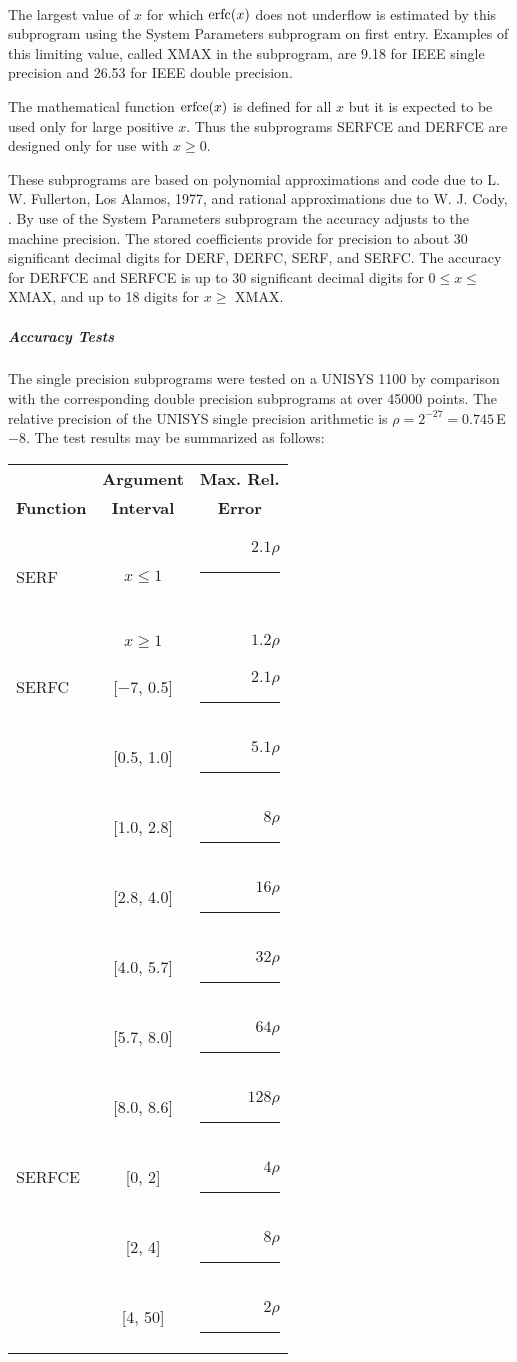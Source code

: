 \documentclass[twoside]{MATH77}
\begin{document}
\hspace{5pt}\mbox{ }

The largest value of $x$ for which $\erfc (x)$ does not underflow is estimated
by this subprogram using the System Parameters subprogram on first entry.
Examples of this limiting value, called XMAX in the subprogram, are 9.18 for
IEEE single precision and 26.53 for IEEE double precision.

The mathematical function $\erfce (x)$ is defined for all $x$ but it is
expected to be used only for large positive $x$. Thus the subprograms SERFCE
and DERFCE are designed only for use with $x \geq 0.$

These subprograms are based on polynomial approximations and code due to L.
W. Fullerton, Los Alamos, 1977, and rational approximations due to W. J.
Cody, \cite{Cody:1969:RCA}. By use of the System Parameters subprogram the
accuracy adjusts to the machine precision. The stored coefficients provide for
precision to about 30 significant decimal digits for DERF, DERFC, SERF, and
SERFC. The accuracy for DERFCE and SERFCE is up to 30 significant decimal
digits for $0 \leq x \leq $ XMAX, and up to 18 digits for $x \geq $ XMAX.

\subparagraph{Accuracy Tests}

The single precision subprograms were tested on a UNISYS 1100 by comparison
with the corresponding double precision subprograms at over 45000 points.
The relative precision of the UNISYS single precision arithmetic is $\rho =
2^{-27} = 0.745$\,E$-8$. The test results may be summarized as follows:

\begin{center}
\begin{tabular}{lcr}
 & {\bf Argument} & \multicolumn{1}{c}{\bf Max. Rel.}\\
\multicolumn{1}{c}{\bf Function} & {\bf Interval} &
\multicolumn{1}{c}{\bf Error}\\
SERF & \multicolumn{1}{c}{$x \leq 1$} & $2.1\rho $\rule{.25in}{0pt}~\\
 & $x \geq 1$ & $1.2\rho $\hspace{.25in}\rule[-7pt]{0pt}{8pt}\\
SERFC & [$-$7, 0.5] & $2.1\rho $\rule{.25in}{0pt}\\
 & [0.5, 1.0] & $5.1\rho $\rule{.25in}{0pt}\\
 & [1.0, 2.8] & $8\rho $\rule{.25in}{0pt}\\
 & [2.8, 4.0] & $16\rho $\rule{.25in}{0pt}\\
 & [4.0, 5.7] & $32\rho $\rule{.25in}{0pt}\\
 & [5.7, 8.0] & $64\rho $\rule{.25in}{0pt}\\
 & [8.0, 8.6] & $128\rho $\rule{.25in}{0pt}\rule[-7pt]{0pt}{8pt}\\
SERFCE & [0, 2] & $4\rho $\rule{.25in}{0pt}\\
& [2, 4] & $8\rho $\rule{.25in}{0pt}\\
& [4, 50] & $2\rho $\rule{.25in}{0pt}
\end{tabular}
\end{center}
\end{document}
